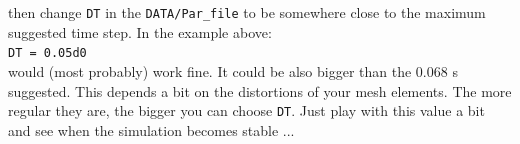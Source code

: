 \begin{description}
\begin{lyxcode}
\end{lyxcode}

then change \texttt{DT} in the \texttt{DATA/Par\_file} to be somewhere
close to the maximum suggested time step. In the example above: \\
 \texttt{DT = 0.05d0} \\
 would (most probably) work fine. It could be also bigger than the
0.068 s suggested. This depends a bit on the distortions of your mesh
elements. The more regular they are, the bigger you can choose \texttt{DT}.
Just play with this value a bit and see when the simulation becomes
stable ...

\end{description}

